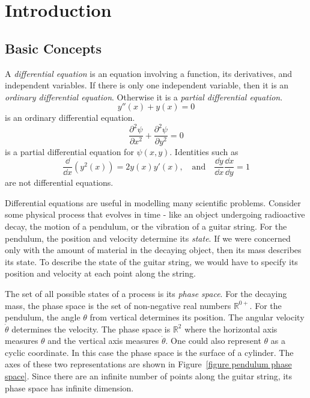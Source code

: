 \flushbottom




\chapter{Introduction}
\label{chapter_ode_introduction}




\section{Basic Concepts}

A \textit{differential equation} is an equation involving a function,
its derivatives, and independent variables.  If there is only one 
independent variable, then it is an 
\textit{ordinary differential equation}.
Otherwise it is a 
\textit{partial differential equation}.
\[
y''(x) + y(x) = 0
\]
is an ordinary differential equation.
\[
\frac{ \partial^2 \psi}{\partial x^2} + \frac{ \partial^2 \psi}{\partial y^2} = 0
\]
is a partial differential equation for $\psi(x,y)$.
Identities such as 
\[
\frac{\dd}{\dd x} \left( y^2(x) \right) = 2 y(x) y'(x), 
\quad \mathrm{and} \quad
\frac{\dd y}{\dd x} \frac{\dd x}{\dd y} = 1
\]
are not differential equations.



Differential equations are useful in modelling many scientific problems.
Consider some physical process that evolves in time - like an object 
undergoing radioactive decay, the motion of a pendulum, or the 
vibration of a guitar string.  
For the pendulum, the position and velocity determine its \textit{state}.
If we were concerned only with the amount of material in the decaying object,
then its mass describes its state.  To describe the state of the guitar
string, we would have to specify its position and velocity at each point
along the string.  

The set of all possible states of a process is its \textit{phase
  space}.  For the decaying mass, the phase space is the set of
non-negative real numbers $\mathbb{R}^{0+}$.  For the pendulum, the
angle $\theta$ from vertical determines its position.  The angular velocity
$\dot{\theta}$ determines the velocity.  The phase space is $\mathbb{R}^2$
where the horizontal axis measures $\theta$ and the vertical axis measures
$\dot{\theta}$.  One could also represent $\theta$ as a cyclic coordinate.  In 
this case the phase space is the surface of a cylinder.  The axes of
these two representations are shown in 
Figure~\ref{figure pendulum phase space}.
Since there are an infinite number of points along the guitar string,
its phase space has infinite dimension.


